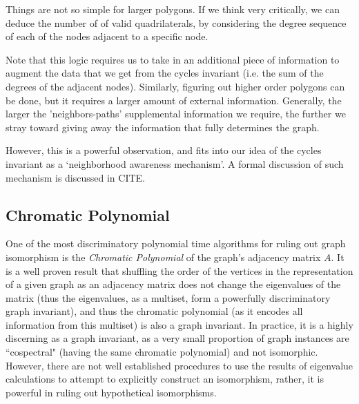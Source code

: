 Things are not so simple for larger polygons.  If we think very critically, we can deduce the number of of valid quadrilaterals, by considering the degree sequence of each of the nodes adjacent to a specific node.

Note that this logic requires us to take in an additional piece of information to augment the data that we get from the cycles invariant (i.e. the sum of the degrees of the adjacent nodes).
Similarly, figuring out higher order polygons can be done, but it requires a larger amount of external information.
Generally, the larger the 'neighbors-paths' supplemental information we require, the further we stray toward giving away the information that fully determines the graph.

However, this is a powerful observation, and fits into our idea of the cycles invariant as a `neighborhood awareness mechanism'. A formal discussion of such mechanism is discussed in CITE.

\subsection{Chromatic Polynomial}
One of the most discriminatory polynomial time algorithms for ruling out graph isomorphism is the \emph{Chromatic Polynomial} of the graph's adjacency matrix $A$.
It is a well proven result that shuffling the order of the vertices in the representation of a given graph as an adjacency matrix does not change the eigenvalues of the matrix (thus the eigenvalues, as a multiset, form a powerfully discriminatory graph invariant), and thus the chromatic polynomial (as it encodes all information from this multiset) is also a graph invariant.
In practice, it is a highly discerning as a graph invariant, as a very small proportion of graph instances are ``cospectral" (having the same chromatic polynomial) and not isomorphic.
However, there are not well established procedures to use the results of eigenvalue calculations to attempt to explicitly construct an isomorphism, rather, it is powerful in ruling out hypothetical isomorphisms. 

